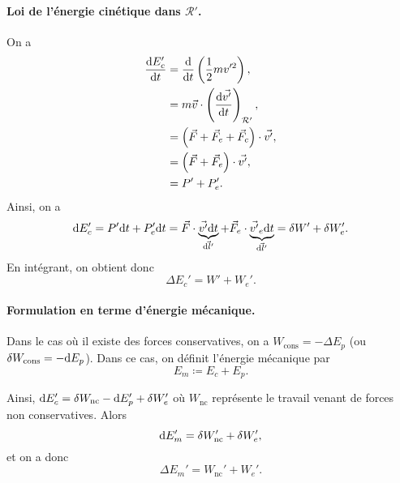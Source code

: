             \paragraph{Loi de l'énergie cinétique dans $\mathcal{R}'$.}
                On a 
                \begin{align*}
                    \frac{\mathrm{d} E_{c}'}{\mathrm{d} t} 
                    &= \frac{\mathrm{d}}{\mathrm{d} t}\left(\frac{1}{2}m v'^{2}\right),\\
                    &= m\vec{v}\cdot\left(\frac{\mathrm{d}\vec{v'}}{\mathrm{d} t}\right)_{\mathcal{R}'},\\
                    &=\left(\vec{F}+\vec{F}_e+\vec{F}_c\right)\cdot\vec{v'},\\
                    &=\left(\vec{F}+\vec{F}_e\right)\cdot\vec{v'},\\
                    &=P' + P_e'.
                \end{align*}
                Ainsi, on a 
                \begin{equation*}
                    \mathrm{d} E_c'=P'\mathrm{d} t+P_e'\mathrm{d} t=\vec{F}\cdot\underbrace{\vec{v'}\mathrm{d} t}_{\vec{\mathrm{d} l'}}+\vec{F}_e\cdot\underbrace{\vec{v'}_e\mathrm{d} t}_{\vec{\mathrm{d} l'}}=\delta W'+\delta W_e'.
                \end{equation*}
                En intégrant, on obtient donc
                \begin{equation*}
                    \boxed{\Delta E_c'=W'+W_e'.}    
                \end{equation*}
            
            \paragraph{Formulation en terme d'énergie mécanique.} Dans le cas où il existe des forces conservatives, on a $W_{\text{cons}}=-\Delta E_p$ (ou $\delta W_{\text{cons}}=-\mathrm{d} E_p$). Dans ce cas, on définit l'énergie mécanique par
            \begin{equation*}
                \boxed{E_m\coloneqq E_c+E_p.}
            \end{equation*}

            Ainsi, $\mathrm{d} E_c'=\delta W_{\text{nc}}-\mathrm{d} E_p'+\delta W_e'$ où $W_{\text{nc}}$ représente le travail venant de forces non conservatives. Alors 
            \begin{equation*}
                \mathrm{d} E_m'=\delta W_{\text{nc}}'+\delta W_{e}',
            \end{equation*}
            et on a donc
            \begin{equation*}
                \boxed{\Delta E_m'=W_{\text{nc}}'+W_e'.}
            \end{equation*}
        
